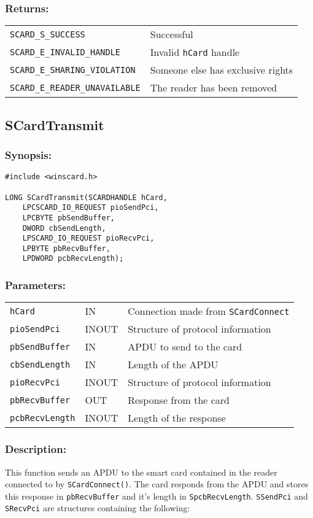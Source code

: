 \documentclass[a4paper,12pt]{article}
\newcommand{\synopsis}{\subsubsection{Synopsis:}}
\newcommand{\parameters}{\subsubsection{Parameters:}}
\newcommand{\desc}{\subsubsection{Description:}}
\newcommand{\returns}{\subsubsection{Returns:}}
\begin{document}
\returns

\begin{tabular}{ll}
\texttt{SCARD\_S\_SUCCESS}			& Successful\\
\texttt{SCARD\_E\_INVALID\_HANDLE}		& Invalid \texttt{hCard} handle\\
\texttt{SCARD\_E\_SHARING\_VIOLATION}	& Someone else has exclusive rights\\
\texttt{SCARD\_E\_READER\_UNAVAILABLE} 	& The reader has been removed\\
\end{tabular}


\subsection{SCardTransmit}

\synopsis

\begin{verbatim}
#include <winscard.h>

LONG SCardTransmit(SCARDHANDLE hCard,
    LPCSCARD_IO_REQUEST pioSendPci,
    LPCBYTE pbSendBuffer,
    DWORD cbSendLength,
    LPSCARD_IO_REQUEST pioRecvPci,
    LPBYTE pbRecvBuffer,
    LPDWORD pcbRecvLength);
\end{verbatim}

\parameters

\begin{tabular}{lll}
\texttt{hCard} &		IN &	Connection made from \texttt{SCardConnect} \\
\texttt{pioSendPci} &		INOUT &  Structure of protocol information\\
\texttt{pbSendBuffer} &		IN &	APDU to send to the card\\
\texttt{cbSendLength} &		IN &	Length of the APDU\\
\texttt{pioRecvPci} &		INOUT &	Structure of protocol information\\
\texttt{pbRecvBuffer} &		OUT &	Response from the card\\
\texttt{pcbRecvLength} &	INOUT &	Length of the response\\
\end{tabular}

\desc

This function sends an APDU  to the smart card contained in the reader
connected to by \texttt{SCardConnect()}.  The card responds from the
APDU and stores this response in \texttt{pbRecvBuffer} and it's length
in \texttt{SpcbRecvLength}.  \texttt{SSendPci} and \texttt{SRecvPci} are
structures containing the following:
\end{document}

